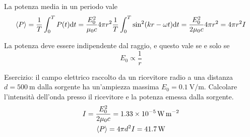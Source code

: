 La potenza media in un periodo vale
\begin{equation}
    \left\langle P \right\rangle = \frac{1}{T} \int_0^T P(t) \mathrm{d} t
    = \frac{E_0^2}{\mu_0 c} 4 \pi r^2 \frac{1}{T} \int_0^T \sin^2(kr - \omega t) \mathrm{d} t
    = \frac{E_0^2}{2\mu_0 c} 4 \pi r^2
    = 4 \pi r^2 I
\end{equation}

La potenza deve essere indipendente dal raggio, e questo vale se e solo se
\begin{equation}
    E_0 \propto \frac{1}{r}
\end{equation}

Esercizio: il campo elettrico raccolto da un ricevitore radio a una distanza $d = \qty{500}{\metre}$ dalla sorgente ha un'ampiezza massima $E_0 = \qty{0.1}{\volt\per\metre}$. Calcolare l'intensità dell'onda presso il ricevitore e la potenza emessa dalla sorgente.
\begin{gather}
    I = \frac{E_0^2}{2 \mu_0 c} = \qty{1.33e-5}{\watt\per\metre\squared} \\
    \left\langle P \right\rangle = 4 \pi d^2 I = \qty{41.7}{\watt}
\end{gather}
